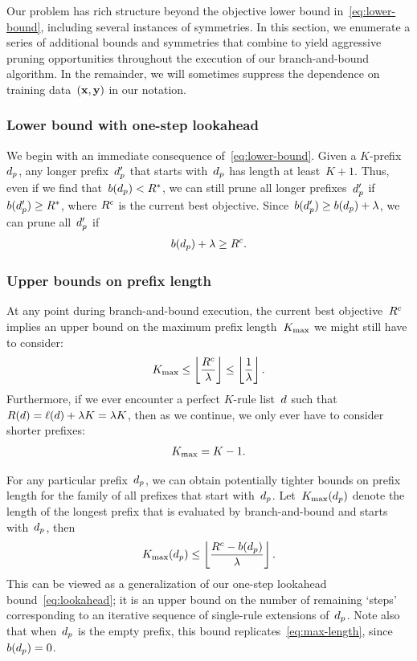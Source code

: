 Our problem has rich structure beyond the objective lower bound in~\eqref{eq:lower-bound},
including several instances of symmetries.
%
In this section, we enumerate a series of additional bounds and symmetries that
combine to yield aggressive pruning opportunities throughout the execution of
our branch-and-bound algorithm.
%
In the remainder, we will sometimes suppress the dependence on
training data~$(\mathbf{x}, \mathbf{y})$ in our notation.

\subsubsection{Lower bound with one-step lookahead}

We begin with an immediate consequence of~\eqref{eq:lower-bound}.
%
Given a $K$-prefix~$d_p$, any longer prefix~$d_p'$ that starts
with~$d_p$ has length at least~${K+1}$.
%
Thus, even if we find that~${b(d_p) < R^*}$, we can still prune all longer
prefixes~$d_p'$ if ${b(d_p') \ge R^*}$,
where $R^c$ is the current best objective.
%
Since~${b(d_p') \ge b(d_p) + {\lambda}}$,
we can prune all~$d_p'$ if
\begin{align}
 b(\Prefix) + \Reg \ge \CurrentObj.
\label{eq:lookahead}
\end{align}

\subsubsection{Upper bounds on prefix length}
\label{sec:ub-prefix-length}

At any point during branch-and-bound execution, the current best objective~$R^c$
implies an upper bound on the maximum prefix length~${K_{\text{max}}}$ we might still have to consider:
\begin{align}
\MaxLength \le \left\lfloor \frac{\CurrentObj}{\Reg} \right\rfloor
\le \left\lfloor \frac{1}{\Reg} \right\rfloor.
\label{eq:max-length}
\end{align}
Furthermore, if we ever encounter a perfect $K$-rule list~${d}$
such that~${R({d}) = \ell({d}) + {\lambda} K = {\lambda} K}$, then as we continue,
we only ever have to consider shorter prefixes:
\begin{align}
\MaxLength = K - 1.
\label{eq:max-length-perfect}
\end{align}

For any particular prefix~$d_p$, we can obtain potentially tighter bounds on
prefix length for the family of all prefixes that start with~$d_p$.
%
Let~${K_{\text{max}}}(d_p)$ denote the length of the longest prefix that is
evaluated by branch-and-bound and starts with~$d_p$, then
\begin{align}
\MaxLength(\Prefix) \le \left\lfloor \frac{\CurrentObj - b(\Prefix)}{\Reg} \right\rfloor.
\label{eq:max-length-prefix}
\end{align}
This can be viewed as a generalization of our one-step lookahead
bound~\eqref{eq:lookahead}; it is an upper bound on the number of remaining `steps'
corresponding to an iterative sequence of single-rule extensions of~$d_p$.
%
Note also that when~$d_p$ is the empty prefix,
this bound replicates~\eqref{eq:max-length}, since~${b(d_p) = 0}$.

